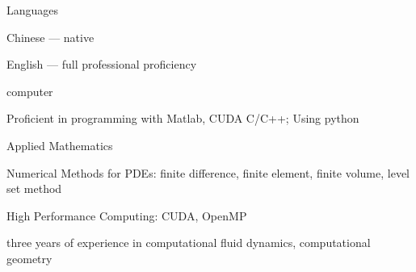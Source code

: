 
\begin{cvskills}
  \cvskill
    {Languages} %
    {
      \begin{cvitems} %
        \item {Chinese --- native}
        \item {English --- full professional proficiency}
      \end{cvitems}
    } %

  \cvskill
    {computer} %
    {
      \begin{cvitems} %
        \item {Proficient in programming with Matlab, CUDA C/C++; Using python}
      \end{cvitems}
    } %

    \cvskill
    {Applied Mathematics} %
    {
      \begin{cvitems} %
        \item {Numerical Methods for PDEs: finite difference, finite element, finite volume, level set method}
        \item {High Performance Computing: CUDA, OpenMP}
        \item {three years of experience in computational fluid dynamics, computational geometry}
      \end{cvitems}
    } %

\end{cvskills}

